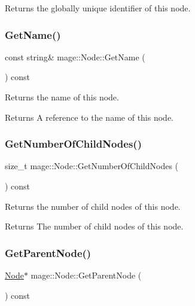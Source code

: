 Returns the globally unique identifier of this node. \hypertarget{classmage_1_1_node_a206e7c7ef80a0561b31ebbb9d05c98a0}{}\label{classmage_1_1_node_a206e7c7ef80a0561b31ebbb9d05c98a0} 
\subsubsection{\texorpdfstring{Get\+Name()}{GetName()}}
{\footnotesize\ttfamily const string\& mage\+::\+Node\+::\+Get\+Name (\begin{DoxyParamCaption}{ }\end{DoxyParamCaption}) const\hspace{0.3cm}{\ttfamily [noexcept]}}

Returns the name of this node.

\begin{DoxyReturn}{Returns}
A reference to the name of this node. 
\end{DoxyReturn}
\hypertarget{classmage_1_1_node_ab4fff9779c09d873abcf881b6ff85d9e}{}\label{classmage_1_1_node_ab4fff9779c09d873abcf881b6ff85d9e} 
\subsubsection{\texorpdfstring{Get\+Number\+Of\+Child\+Nodes()}{GetNumberOfChildNodes()}}
{\footnotesize\ttfamily size\+\_\+t mage\+::\+Node\+::\+Get\+Number\+Of\+Child\+Nodes (\begin{DoxyParamCaption}{ }\end{DoxyParamCaption}) const\hspace{0.3cm}{\ttfamily [noexcept]}}

Returns the number of child nodes of this node.

\begin{DoxyReturn}{Returns}
The number of child nodes of this node. 
\end{DoxyReturn}
\hypertarget{classmage_1_1_node_a21ba704ed3af4c80d096ad5f393da8e0}{}\label{classmage_1_1_node_a21ba704ed3af4c80d096ad5f393da8e0} 
\subsubsection{\texorpdfstring{Get\+Parent\+Node()}{GetParentNode()}}
{\footnotesize\ttfamily \hyperlink{classmage_1_1_node}{Node}$\ast$ mage\+::\+Node\+::\+Get\+Parent\+Node (\begin{DoxyParamCaption}{ }\end{DoxyParamCaption}) const\hspace{0.3cm}{\ttfamily [noexcept]}}


